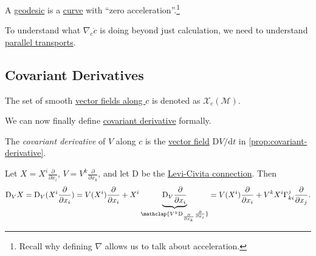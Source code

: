 \begin{intuition}
	A \hyperref[def:geodesic]{geodesic} is a \hyperref[def:curve]{curve} with ``zero acceleration''.\footnote{Recall why defining \(\nabla \) allows us to talk about acceleration.}
\end{intuition}

To understand what \(\nabla _{\dot{c} } \dot{c} \) is doing beyond just calculation, we need to understand \hyperref[def:parallel-transport]{parallel transports}.

\subsection{Covariant Derivatives}
\begin{prev}
	The set of smooth \hyperref[def:vector-field-along-curve]{vector fields along \(c\)} is denoted as \(\mathcal{X} _c(\mathcal{M} )\).
\end{prev}

We can now finally define \hyperref[def:covariant-derivative]{covariant derivative} formally.

\begin{definition}\label{def:covariant-derivative}
	The \emph{covariant derivative} of \(V\) along \(c\) is the \hyperref[def:vector-field-along-curve]{vector field} \(\mathrm{D} V / \mathrm{d} t\) in \autoref{prop:covariant-derivative}.
\end{definition}

\begin{prev}
	Let \(X = X^i \frac{\partial }{\partial x_i}\), \(V = V^k \frac{\partial}{\partial x_k}\), and let \(\mathrm{D} \) be the \hyperref[def:Levi-Civita-connection]{Levi-Civita connection}. Then
	\[
		\mathrm{D}_V X
		= \mathrm{D} _V(X^i \frac{\partial}{\partial x_i})
		= V(X^i) \frac{\partial}{\partial x_i} + X^i \underbrace{\mathrm{D} _V \frac{\partial}{\partial x_i}}_{\mathclap{V^k \mathrm{D}_{\frac{\partial}{\partial x_k}} \frac{\partial}{\partial x_i}}}
		= V(X^i)\frac{\partial}{\partial x_i} + V^k X^i \Gamma ^j_{ki} \frac{\partial }{\partial x_j} .
	\]
\end{prev}

